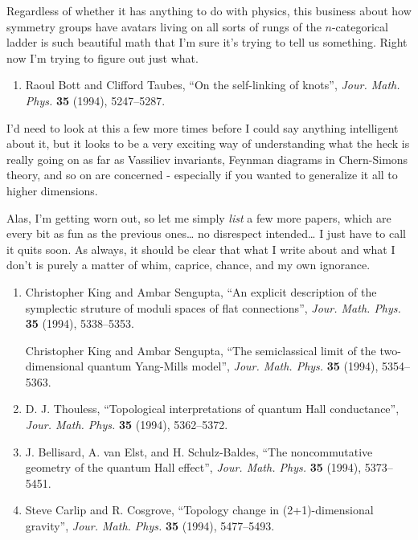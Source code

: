 \documentclass{article}
\def\tightlist{}
\begin{document}
Regardless of whether it has anything to do with physics, this business
about how symmetry groups have avatars living on all sorts of rungs of
the \(n\)-categorical ladder is such beautiful math that I'm sure it's
trying to tell us something. Right now I'm trying to figure out just
what.

\begin{enumerate}
\def\labelenumi{\arabic{enumi})}
\setcounter{enumi}{2}
\tightlist
\item
  Raoul Bott and Clifford Taubes, ``On the self-linking of knots'',
  \emph{Jour. Math. Phys.} \textbf{35} (1994), 5247--5287.
\end{enumerate}

I'd need to look at this a few more times before I could say anything
intelligent about it, but it looks to be a very exciting way of
understanding what the heck is really going on as far as Vassiliev
invariants, Feynman diagrams in Chern-Simons theory, and so on are
concerned - especially if you wanted to generalize it all to higher
dimensions.

Alas, I'm getting worn out, so let me simply \emph{list} a few more
papers, which are every bit as fun as the previous ones\ldots{} no
disrespect intended\ldots{} I just have to call it quits soon. As
always, it should be clear that what I write about and what I don't is
purely a matter of whim, caprice, chance, and my own ignorance.

\begin{enumerate}
\def\labelenumi{\arabic{enumi})}
\setcounter{enumi}{3}
\item
  Christopher King and Ambar Sengupta, ``An explicit description of the
  symplectic struture of moduli spaces of flat connections'',
  \emph{Jour. Math. Phys.} \textbf{35} (1994), 5338--5353.

  Christopher King and Ambar Sengupta, ``The semiclassical limit of the
  two-dimensional quantum Yang-Mills model'', \emph{Jour. Math. Phys.}
  \textbf{35} (1994), 5354--5363.
\item
  D. J. Thouless, ``Topological interpretations of quantum Hall
  conductance'', \emph{Jour. Math. Phys.} \textbf{35} (1994),
  5362--5372.
\item
  J. Bellisard, A. van Elst, and H. Schulz-Baldes, ``The noncommutative
  geometry of the quantum Hall effect'', \emph{Jour. Math. Phys.}
  \textbf{35} (1994), 5373--5451.
\item
  Steve Carlip and R. Cosgrove, ``Topology change in (2+1)-dimensional
  gravity'', \emph{Jour. Math. Phys.} \textbf{35} (1994), 5477--5493.
\end{enumerate}
\end{document}
